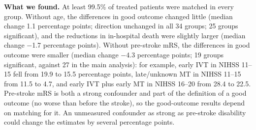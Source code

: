 \textbf{What we found.} At least 99.5\% of treated patients were matched in every group. Without age, the differences in good outcome changed little (median change 1.1 percentage points; direction unchanged in all 34 groups; 25 groups significant), and the reductions in in-hospital death were slightly larger (median change $-$1.7 percentage points). Without pre-stroke mRS, the differences in good outcome were smaller (median change $-$4.3 percentage points; 19 groups significant, against 27 in the main analysis): for example, early IVT in NIHSS 11--15 fell from 19.9 to 15.5 percentage points, late/unknown MT in NIHSS 11--15 from 11.5 to 4.7, and early IVT plus early MT in NIHSS 16--20 from 28.4 to 22.5. Pre-stroke mRS is both a strong confounder and part of the definition of a good outcome (no worse than before the stroke), so the good-outcome results depend on matching for it. An unmeasured confounder as strong as pre-stroke disability could change the estimates by several percentage points.

\clearpage

